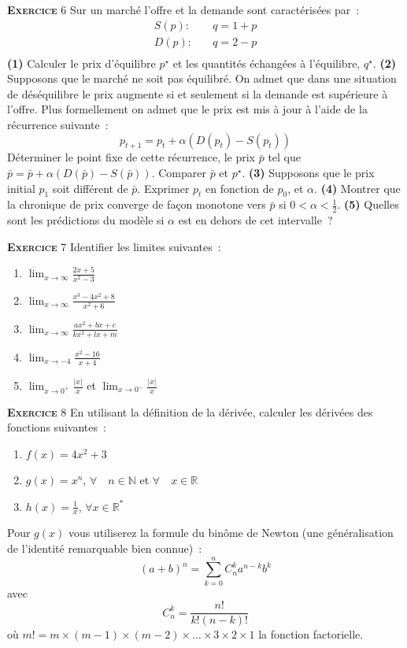 \documentclass[10pt,a4paper,notitlepage]{article}
\newcommand{\exercice}[1]{\textsc{\textbf{Exercice}} #1}
\begin{document}
\exercice{6} Sur un marché l'offre et la demande sont caractérisées
par :
\[
\begin{split}
  S(p): &\quad q = 1+p\\
  D(p): &\quad q = 2-p\\
\end{split}
\]
\textbf{(1)} Calculer le prix d'équilibre $p^{\star}$ et les quantités échangées à
l'équilibre, $q^{\star}$. \textbf{(2)} Supposons que le marché ne soit pas
équilibré. On admet que dans une situation de déséquilibre le prix
augmente si et seulement si la demande est supérieure à l'offre. Plus
formellement on admet que le prix est mis à jour à l'aide de la
récurrence suivante :
\[
p_{t+1} = p_t + \alpha (D(p_t)-S(p_t))
\]
Déterminer le point fixe de cette récurrence, le prix $\bar p$ tel que
$\bar p = \bar p + \alpha (D(\bar p)-S(\bar p))$. Comparer $\bar p$ et
$p^{\star}$. \textbf{(3)} Supposons que le prix initial $p_1$ soit
différent de $\bar p$. Exprimer $p_t$ en fonction de $p_0$,
et $\alpha$. \textbf{(4)} Montrer que la chronique de prix converge de
façon monotone vers $\bar p$ si $0<\alpha<\frac{1}{2}$. \textbf{(5)}
Quelles sont les prédictions du modèle si $\alpha$ est en dehors de
cet intervalle ?

\bigskip

\exercice{7} Identifier les limites suivantes :
\begin{enumerate}
\item $\lim_{x\rightarrow\infty} \frac{2x+5}{x^2-3}$
\item $\lim_{x\rightarrow\infty} \frac{x^3-4x^2+8}{x^2+6}$
\item $\lim_{x\rightarrow\infty} \frac{ax^2+bx+c}{kx^2+lx+m}$
\item $\lim_{x\rightarrow -4} \frac{x^2-16}{x+4}$
\item $\lim_{x\rightarrow 0^+} \frac{|x|}{x}$ et $\lim_{x\rightarrow 0^-} \frac{|x|}{x}$
\end{enumerate}

\bigskip

\exercice{8} En utilisant la définition de la dérivée, calculer les
dérivées des fonctions suivantes :
\begin{enumerate}
\item $f(x) = 4x^2+3$
\item $g(x) = x^n$, $\forall\quad n\in \mathbb N$ et $\forall\quad x\in \mathbb R$
\item $h(x) = \frac{1}{x}$, $\forall x\in \mathbb R^*$
\end{enumerate}
Pour $g(x)$ vous utiliserez la formule du binôme de Newton (une
généralisation de l'identité remarquable bien connue) :
\[
(a+b)^n = \sum_{k=0}^n C_n^ka^{n-k}b^k
\]
avec
\[
C_n^k = \frac{n!}{k!(n-k)!}
\]
où $m! = m\times(m-1)\times(m-2)\times\dots\times 3\times 2\times 1$
la fonction factorielle.
\end{document}

